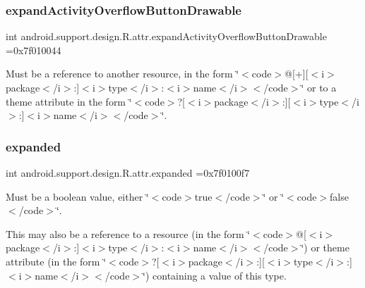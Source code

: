 \subsubsection{\texorpdfstring{expand\+Activity\+Overflow\+Button\+Drawable}{expandActivityOverflowButtonDrawable}}
{\footnotesize\ttfamily int android.\+support.\+design.\+R.\+attr.\+expand\+Activity\+Overflow\+Button\+Drawable =0x7f010044\hspace{0.3cm}{\ttfamily [static]}}

Must be a reference to another resource, in the form \char`\"{}$<$code$>$@\mbox{[}+\mbox{]}\mbox{[}$<$i$>$package$<$/i$>$\+:\mbox{]}$<$i$>$type$<$/i$>$\+:$<$i$>$name$<$/i$>$$<$/code$>$\char`\"{} or to a theme attribute in the form \char`\"{}$<$code$>$?\mbox{[}$<$i$>$package$<$/i$>$\+:\mbox{]}\mbox{[}$<$i$>$type$<$/i$>$\+:\mbox{]}$<$i$>$name$<$/i$>$$<$/code$>$\char`\"{}. \mbox{\label{classandroid_1_1support_1_1design_1_1R_1_1attr_a3f3c11279bf1f89eabce9386b4cc52e7}} 
\subsubsection{\texorpdfstring{expanded}{expanded}}
{\footnotesize\ttfamily int android.\+support.\+design.\+R.\+attr.\+expanded =0x7f0100f7\hspace{0.3cm}{\ttfamily [static]}}

Must be a boolean value, either \char`\"{}$<$code$>$true$<$/code$>$\char`\"{} or \char`\"{}$<$code$>$false$<$/code$>$\char`\"{}. 

This may also be a reference to a resource (in the form \char`\"{}$<$code$>$@\mbox{[}$<$i$>$package$<$/i$>$\+:\mbox{]}$<$i$>$type$<$/i$>$\+:$<$i$>$name$<$/i$>$$<$/code$>$\char`\"{}) or theme attribute (in the form \char`\"{}$<$code$>$?\mbox{[}$<$i$>$package$<$/i$>$\+:\mbox{]}\mbox{[}$<$i$>$type$<$/i$>$\+:\mbox{]}$<$i$>$name$<$/i$>$$<$/code$>$\char`\"{}) containing a value of this type. \mbox{\label{classandroid_1_1support_1_1design_1_1R_1_1attr_a8d74b901cc208373f39160eb9126e754}} 
